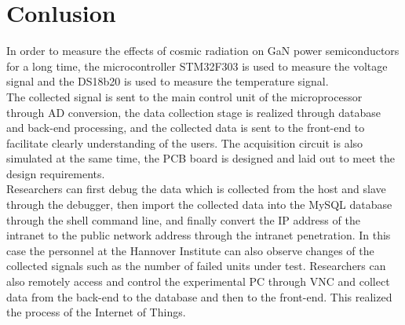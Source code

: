 \chapter{Conlusion}
\label{chap:Conlusion}
In order to measure the effects of cosmic radiation on GaN power semiconductors for a long time, the microcontroller STM32F303 is used to measure the voltage signal and the DS18b20 is used to measure the temperature signal.
\\
The collected signal is sent to the main control unit of the microprocessor through AD conversion, the data collection stage is realized through database and back-end processing, and the collected data is sent to the front-end to facilitate clearly understanding of the users.
The acquisition circuit is also simulated at the same time, the PCB board is designed and laid out to meet the design requirements.
\\
Researchers can first debug the data which is collected from the host and slave through the debugger, then import the collected data into the MySQL database through the shell command line, and finally convert the IP address of the intranet to the public network address through the intranet penetration. In this case the personnel at the Hannover Institute can also observe changes of the collected signals such as the number of failed units under test. Researchers can also remotely access and control the experimental PC through VNC and collect data from the back-end to the database and then to the front-end. This realized the process of the Internet of Things.




  



 



